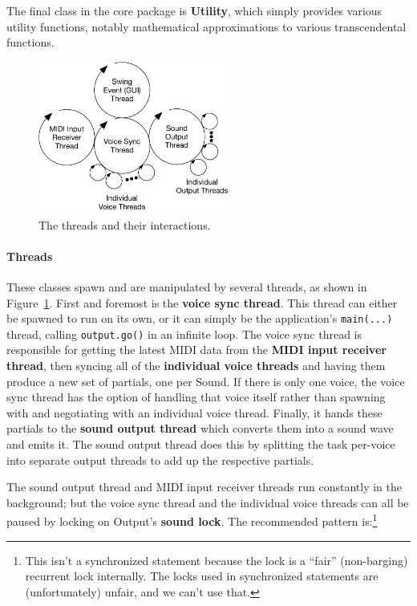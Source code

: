 \documentclass{article}
\begin{document}
The final class in the core package is {\bf Utility}, which simply provides various utility functions, notably mathematical approximations to various transcendental functions.

\begin{figure}
\vspace{-1em}\includegraphics[width=2.5in]{Threads.pdf}
\vspace{-2em}
\caption{The threads and their interactions.}
\label{threads}
\end{figure}

\paragraph{Threads} These classes spawn and are manipulated by several threads, as shown in Figure~\ref{threads}.  First and foremost is the {\bf voice sync thread}.  This thread can either be spawned to run on its own, or it can simply be the application's \texttt{main(...)} thread, calling \texttt{output.go()} in an infinite loop.  The voice sync thread is responsible for getting the latest MIDI data from the {\bf MIDI input receiver thread}, then syncing all of the {\bf individual voice threads} and having them produce a new set of partials, one per Sound.  If there is only one voice, the voice sync thread has the option of handling that voice itself rather than spawning with and negotiating with an individual voice thread.  Finally, it hands these partials to the {\bf sound output thread} which converts them into a sound wave and emits it.  The sound output thread does this by splitting the task per-voice into separate output threads to add up the respective partials.

The sound output thread and MIDI input receiver threads run constantly in the background; but the voice sync thread and the individual voice threads can all be paused by locking on Output's {\bf sound lock}.  The recommended pattern is:\footnote{This isn't a synchronized statement because the lock is a ``fair'' (non-barging) recurrent lock internally.  The locks used in synchronized statements are (unfortunately) unfair, and we can't use that.}
\end{document}
